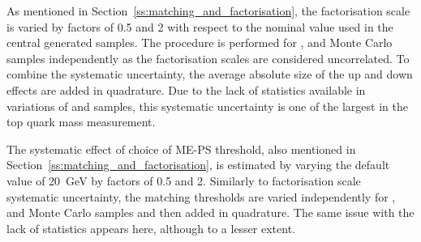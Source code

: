 \begin{description}[wide=\parindent]

\item [Factorisation scale.]
As mentioned in Section~\ref{ss:matching_and_factorisation}, the factorisation scale is varied by factors of
0.5 and 2 with respect to the nominal value used in the central generated samples. The procedure is performed for
\ttjets, \WpJets and \ZpJets Monte Carlo samples independently as the factorisation scales are considered uncorrelated.
To combine the systematic uncertainty, the average absolute size of the up and down effects are added in quadrature. Due
to the lack of statistics available in variations of \WpJets and \ZpJets samples, this systematic uncertainty is one of
the largest in the top quark mass measurement.


\item [ME-PS matching threshold.]
The systematic effect of choice of ME-PS threshold, also mentioned in
Section~\ref{ss:matching_and_factorisation}, is estimated by varying the default value of \SI{20}{\GeV} by
factors of 0.5 and 2. Similarly to factorisation scale systematic uncertainty, the matching thresholds are varied
independently for \ttjets, \WpJets and \ZpJets Monte Carlo samples and then added in quadrature. The same issue with the
lack of statistics appears here, although to a lesser extent.


\end{description}
